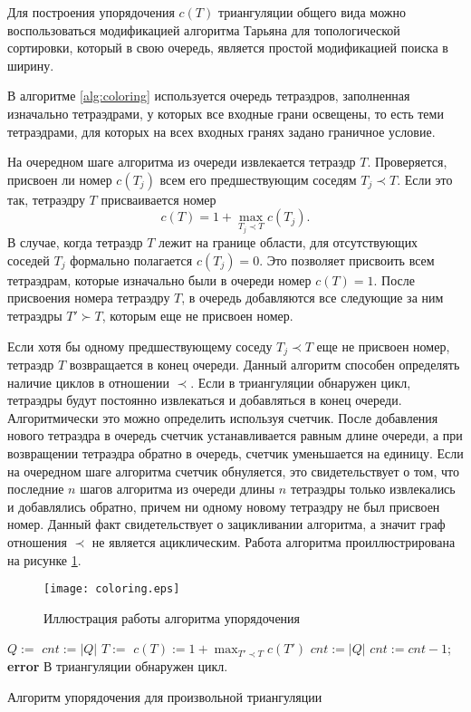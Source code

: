 Для построения упорядочения $c(T)$ триангуляции общего вида можно воспользоваться модификацией алгоритма Тарьяна \cite{Corman} для топологической сортировки, который в свою очередь, является простой модификацией поиска в ширину.

В алгоритме \ref{alg:coloring} используется очередь тетраэдров, заполненная изначально тетраэдрами, у которых все входные грани освещены, то есть теми тетраэдрами, для которых на всех входных гранях задано граничное условие.

На очередном шаге алгоритма из очереди извлекается тетраэдр $T$. Проверяется, присвоен ли номер $c(T_j)$ всем его предшествующим соседям $T_j \prec T$. Если это так, тетраэдру $T$ присваивается номер
\[
c(T) = 1 + \max_{T_j \prec T} c(T_j).
\]
В случае, когда тетраэдр $T$ лежит на границе области, для отсутствующих соседей $T_j$ формально полагается $c(T_j) = 0$. Это позволяет присвоить всем тетраэдрам, которые изначально были в очереди номер $c(T) = 1$. После присвоения номера тетраэдру $T$, в очередь добавляются все следующие за ним тетраэдры $T' \succ T$, которым еще не присвоен номер.

Если хотя бы одному предшествующему соседу $T_j \prec T$ еще не присвоен номер, тетраэдр $T$ возвращается в конец очереди. Данный алгоритм способен определять наличие циклов в отношении $\prec$. Если в триангуляции обнаружен цикл, тетраэдры будут постоянно извлекаться и добавляться в конец очереди. Алгоритмически это можно определить используя счетчик. После добавления нового тетраэдра в очередь счетчик устанавливается равным длине очереди, а при возвращении тетраэдра обратно в очередь, счетчик уменьшается на единицу. Если на очередном шаге алгоритма счетчик обнуляется, это свидетельствует о том, что последние $n$ шагов алгоритма из очереди длины $n$ тетраэдры только извлекались и добавлялись обратно, причем ни одному новому тетраэдру не был присвоен номер. Данный факт свидетельствует о зацикливании алгоритма, а значит граф отношения $\prec$ не является ациклическим. Работа алгоритма проиллюстрирована на рисунке \ref{fig:coloring}.
\begin{figure}[ht!]
\centering
\texttt{[image: coloring.eps]}
\caption{Иллюстрация работы алгоритма упорядочения}
\label{fig:coloring}
\end{figure}

\begin{algorithm}[ht!]
\centering
\begin{algorithmic}[1]
\State $Q :=$ 
\State $cnt := |Q|$
\State $T :=$ 
\State $c(T) := 1 + \max_{T' \prec T} c(T')$
\State {}
\EndFor
\State $cnt := |Q|$
\Else
\State {}
\State $cnt := cnt - 1$;
\EndIf
{}
\State \textbf{error} В триангуляции обнаружен цикл.
\EndIf
\EndWhile
\EndProcedure
\end{algorithmic}
\caption{Алгоритм упорядочения для произвольной триангуляции}
\label{alg:coloring}
\end{algorithm}

